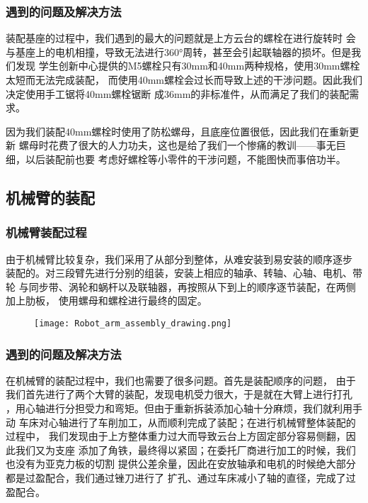 \subsubsection{遇到的问题及解决方法}

{\songti 装配基座的过程中，我们遇到的最大的问题就是上方云台的螺栓在进行旋转时
会与基座上的电机相撞，导致无法进行360°周转，甚至会引起联轴器的损坏。但是我们发现
学生创新中心提供的M5螺栓只有30mm和40mm两种规格，使用30mm螺栓太短而无法完成装配，
而使用40mm螺栓会过长而导致上述的干涉问题。因此我们决定使用手工锯将40mm螺栓锯断
成36mm的非标准件，从而满足了我们的装配需求。}

{\songti 因为我们装配40mm螺栓时使用了防松螺母，且底座位置很低，因此我们在重新更新
螺母时花费了很大的人力功夫，这也是给了我们一个惨痛的教训——事无巨细，以后装配前也要
考虑好螺栓等小零件的干涉问题，不能图快而事倍功半。}


\subsection{机械臂的装配}

\subsubsection{机械臂装配过程}

{\songti 由于机械臂比较复杂，我们采用了从部分到整体，从难安装到易安装的顺序逐步
装配的。对三段臂先进行分别的组装，安装上相应的轴承、转轴、心轴、电机、带轮
与同步带、涡轮和蜗杆以及联轴器，再按照从下到上的顺序逐节装配，在两侧加上肋板，
使用螺母和螺栓进行最终的固定。}

\begin{figure}[!htp]
    \centering
    \texttt{[image: Robot\_arm\_assembly\_drawing.png]}
    \label{fig:机械臂装配图}
\end{figure}

\subsubsection{遇到的问题及解决方法}

{\songti 在机械臂的装配过程中，我们也需要了很多问题。首先是装配顺序的问题，
由于我们首先进行了两个大臂的装配，发现电机受力很大，于是就在大臂上进行打孔
，用心轴进行分担受力和弯矩。但由于重新拆装添加心轴十分麻烦，我们就利用手动
车床对心轴进行了车削加工，从而顺利完成了装配；在进行机械臂整体装配的过程中，
我们发现由于上方整体重力过大而导致云台上方固定部分容易侧翻，因此我们又为支座
添加了角铁，最终得以紧固；在委托厂商进行加工的时候，我们也没有为亚克力板的切割
提供公差余量，因此在安放轴承和电机的时候绝大部分都是过盈配合，我们通过锉刀进行了
扩孔、通过车床减小了轴的直径，完成了过盈配合。}

